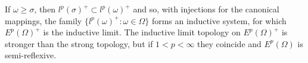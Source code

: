 If $\omega \geq \sigma$, then $l^p(\sigma)^+ \subset l^p(\omega)^+$ and so, with injections for the canonical mappings, the family $\{l^p(\omega)^+ : \omega \in \Omega\}$ forms an inductive system, for which $E^p(\Omega)^+$ is the inductive limit. The inductive limit topology on $E^p(\Omega)^+$ is stronger than the strong topology, but if $1 < p < \infty$ they coincide and $E^p(\Omega)$ is semi-reflexive.
